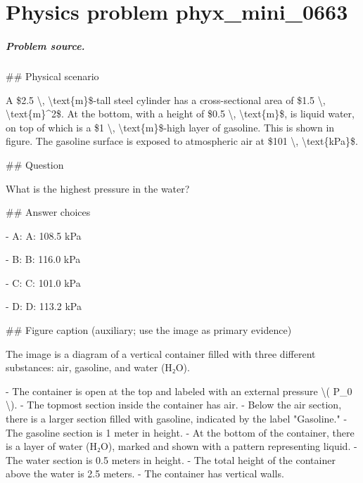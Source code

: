 
\chapter{Physics problem phyx\_mini\_0663}
\label{ch:PhyXMiniProblems_problem_phyx_mini_0663}

\paragraph{Problem source.}
\#\# Physical scenario

A \$2.5 \textbackslash{}, \textbackslash{}text\{m\}\$-tall steel cylinder has a cross-sectional area of \$1.5 \textbackslash{}, \textbackslash{}text\{m\}\textasciicircum{}2\$. At the bottom, with a height of \$0.5 \textbackslash{}, \textbackslash{}text\{m\}\$, is liquid water, on top of which is a \$1 \textbackslash{}, \textbackslash{}text\{m\}\$-high layer of gasoline. This is shown in figure. The gasoline surface is exposed to atmospheric air at \$101 \textbackslash{}, \textbackslash{}text\{kPa\}\$.

\#\# Question

What is the highest pressure in the water?

\#\# Answer choices

- A: A: 108.5 kPa

- B: B: 116.0 kPa

- C: C: 101.0 kPa

- D: D: 113.2 kPa

\#\# Figure caption (auxiliary; use the image as primary evidence)

The image is a diagram of a vertical container filled with three different substances: air, gasoline, and water (H₂O). 

- The container is open at the top and labeled with an external pressure \textbackslash{}( P\_0 \textbackslash{}).
- The topmost section inside the container has air.
- Below the air section, there is a larger section filled with gasoline, indicated by the label "Gasoline."
- The gasoline section is 1 meter in height.
- At the bottom of the container, there is a layer of water (H₂O), marked and shown with a pattern representing liquid.
- The water section is 0.5 meters in height.
- The total height of the container above the water is 2.5 meters.
- The container has vertical walls.

